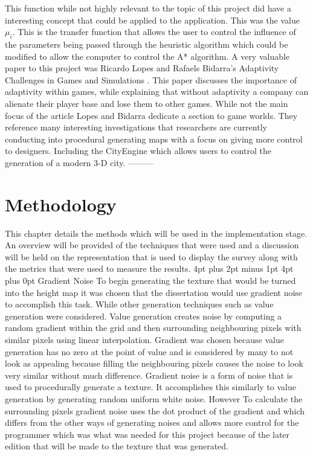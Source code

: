 \documentclass[12pt,a4paper,oneside]{book}
\makeatletter
\renewcommand\section{\@startsection {section}{1}{0mm} %
                               {4pt plus 2pt minus 1pt} %
                               {4pt plus 0pt} %
                               {\bfseries}}
\makeatother
\begin{document}
This function while not highly relevant to the topic of this project did have a interesting concept that could be applied to the application. This was the value \(\mu_i\). This is the transfer function that allows the user to control the influence of the parameters being passed through the heuristic algorithm which could be modified to allow the computer to control the A* algorithm. 
\vspace{5mm} 
\newline
A very valuable paper to this project was Ricardo Lopes and Rafaels Bidarra's Adaptivity Challenges in Games and Simulations \cite{Fun}. This paper discusses the importance of adaptivity within games, while explaining that without adaptivity a company can alienate their player base and lose them to other games. While not the main focus of the article Lopes and Bidarra dedicate a section to game worlds. They reference many interesting investigations that researchers are currently conducting into procedural generating maps with a focus on giving more control to designers. Including the CityEngine which allows users to control the generation of a modern 3-D city.   ---------
\chapter{Methodology}
This chapter details the methods which will be used in the implementation stage. An overview will be provided of the techniques that were used and a discussion will be held on the representation that is used to display the survey along with the metrics that were used to measure the results.
\section{Gradient Noise}
To begin generating the texture that would be turned into the height map it was chosen that the dissertation would use gradient noise to accomplish this task. While other generation techniques such as value generation were considered. Value generation creates noise by computing a random gradient within the grid and then surrounding neighbouring pixels with similar pixels using linear interpolation. Gradient was chosen because value generation has no zero at the point of value and is considered by many to not look as appealing because filling the neighbouring pixels causes the noise to look very similar without much difference.
\vspace{5mm} 
\newline
Gradient noise is a form of noise that is used to procedurally generate a texture. It accomplishes this similarly to value generation by generating random uniform white noise. However To calculate the surrounding pixels gradient noise uses the dot product of the gradient and which differs from the other ways of generating noises and allows more control for the programmer which was what was needed for this project because of the later edition that will be made to the texture that was generated. 
\end{document}
